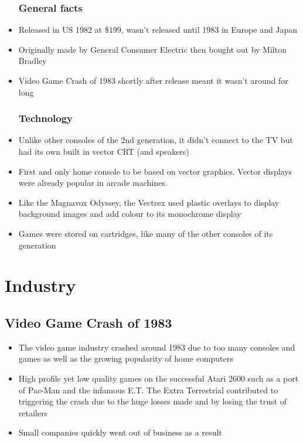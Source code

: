 \documentclass{article}
\begin{document}
\begin{itemize}

\subsubsection*{General facts}
\item Released in US 1982 at \$199, wasn't released until 1983 in Europe and Japan
\item Originally made by General Consumer Electric then bought out by Milton Bradley
\item Video Game Crash of 1983 shortly after release meant it wasn't around for long

\subsubsection*{Technology}
\item Unlike other consoles of the 2nd generation, it didn't connect to the TV but had its own built in vector CRT (and speakers)
\item First and only home console to be based on vector graphics. Vector displays were already popular in arcade machines.
\item Like the Magnavox Odyssey, the Vectrex used plastic overlays to display background images and add colour to its monochrome display
\item Games were stored on cartridges, like many of the other consoles of its generation

\end{itemize}



\section*{Industry}

\subsection*{Video Game Crash of 1983}

\begin{itemize}

\item The video game industry crashed around 1983 due to too many consoles and games as well as the growing popularity of home computers
\item High profile yet low quality games on the successful Atari 2600 such as a port of Pac-Man and the infamous E.T. The Extra Terrestrial contributed to triggering the crash due to the huge losses made and by losing the trust of retailers
\item Small companies quickly went out of business as a result

\end{itemize}

\end{document}
